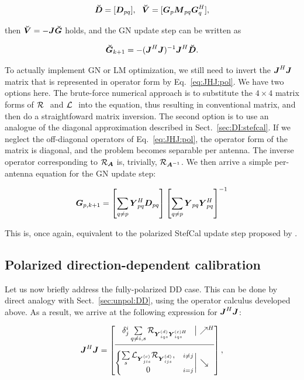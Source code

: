 \documentclass[useAMS,usenatbib]{mn2e}
\newcommand{\mat}[1]{{\bmath{#1}}}
\newcommand{\JJ}{\mat{J}} %
\newcommand{\DD}{\mat{D}}
\newcommand{\MM}{\mat{M}}
\newcommand{\GG}{\mat{G}}
\newcommand{\JHJ}{\JJ^H\JJ} %
\begin{document}
\[
\DDd = [ \DD_{pq} ],~~\VVv = [ \GG_p \MM_{pq} \GG_q^H ],
\]

then $\VVv = -\JJ \GGg$ holds, and the GN update step can be written as

\[
\GGg_{k+1} = - (\JHJ)^{-1} \JJ^H \DDd.
\]


To actually implement GN or LM optimization, we still need to invert the  $\JHJ$ matrix that is represented in operator form 
by Eq.~\ref{eq:JHJ:pol}. We have two options here. The brute-force numerical approach is to substitute the 
$4\times4$ matrix forms of $\mathcal{R}_{{~}}$ and $\mathcal{L}_{{~}}$ into the equation, thus resulting in conventional matrix,
and then do a straightfoward matrix inversion. The second option is to use an analogue of the diagonal 
approximation described in Sect.~\ref{sec:DI:stefcal}. If we neglect the off-diagonal operators of Eq.~\ref{eq:JHJ:pol}, 
the operator form of the matrix is diagonal, and the problem becomes separable per antenna. The inverse operator 
corresponding to $\Rop{\mat{A}}$ is, trivially, $\Rop{\mat{A}^{-1}}$. We then arrive a simple per-antenna equation 
for the GN update step:

\begin{equation}
\label{eq:update:DI:diag:pol}
\GG_{p,k+1} = \left [ \sum\limits_{q\ne p} \YY^H_{pq} \DD_{pq} \right ] 
\left [ \sum\limits_{q\ne p} \YY_{pq} \YY^H_{pq}  \right ]^{-1}
\end{equation}

This is, once again, equivalent to the polarized {\sc StefCal} update step proposed by \citet{Stefcal}.




\subsection{Polarized direction-dependent calibration}

Let us now briefly address the fully-polarized DD case. This can be done by direct analogy with
Sect.~\ref{sec:unpol:DD}, using the operator calculus developed above. As a result, we arrive at the
following expression for $\JHJ$:

\begin{equation}
\label{eq:JHJ:DD:pol}
  \JHJ = \JHJblocks{
  \delta^i_j \sum\limits_{q\ne i,s} \Rop{\YYd_{iqs} \YYcH_{iqs}} 
  }{
  \left \{ 
  \begin{array}{@{}cc@{}}
   \sum\limits_{s} \Lop{ \YYc_{jis}  } \Rop{\YYd_{ijs}},&{\scriptstyle i\ne j} \\
   0 &{\scriptstyle i=j}
  \end{array} \right . 
  }
,
\end{equation}
\end{document}
